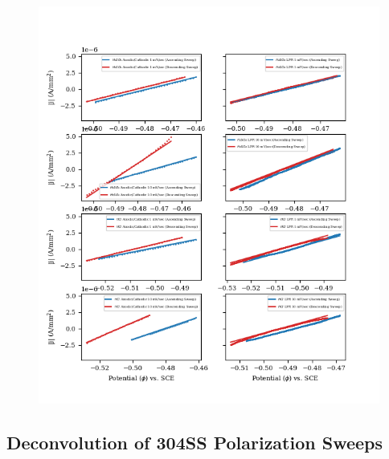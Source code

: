 \begin{table}[h!]
	\centering
	
\end{table}

\begin{figure}[h!]
	\centering
	\includegraphics[width=1.0\linewidth]{resources/fig_2c.png}
\end{figure}

\subsection{Deconvolution of 304SS Polarization Sweeps}


\begin{table}[h!]
	\centering
	
\end{table}

\begin{table}[h!]
	\centering
	
\end{table}

